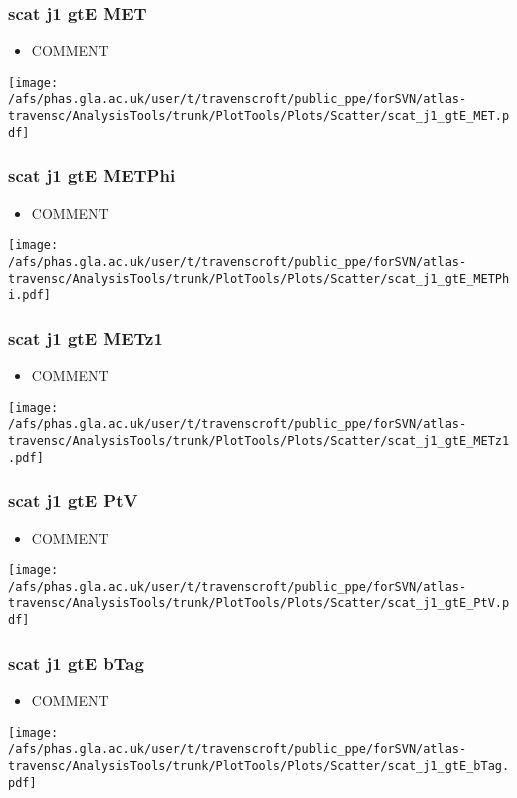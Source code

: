 \documentclass{beamer}
\begin{document}
\begin{frame}
\frametitle{scat j1 gtE MET}
\begin{itemize}
\item COMMENT
\end{itemize}
\begin{center}
\texttt{[image: /afs/phas.gla.ac.uk/user/t/travenscroft/public\_ppe/forSVN/atlas-travensc/AnalysisTools/trunk/PlotTools/Plots/Scatter/scat\_j1\_gtE\_MET.pdf]}
\end{center}
\end{frame}

\begin{frame}
\frametitle{scat j1 gtE METPhi}
\begin{itemize}
\item COMMENT
\end{itemize}
\begin{center}
\texttt{[image: /afs/phas.gla.ac.uk/user/t/travenscroft/public\_ppe/forSVN/atlas-travensc/AnalysisTools/trunk/PlotTools/Plots/Scatter/scat\_j1\_gtE\_METPhi.pdf]}
\end{center}
\end{frame}

\begin{frame}
\frametitle{scat j1 gtE METz1}
\begin{itemize}
\item COMMENT
\end{itemize}
\begin{center}
\texttt{[image: /afs/phas.gla.ac.uk/user/t/travenscroft/public\_ppe/forSVN/atlas-travensc/AnalysisTools/trunk/PlotTools/Plots/Scatter/scat\_j1\_gtE\_METz1.pdf]}
\end{center}
\end{frame}

\begin{frame}
\frametitle{scat j1 gtE PtV}
\begin{itemize}
\item COMMENT
\end{itemize}
\begin{center}
\texttt{[image: /afs/phas.gla.ac.uk/user/t/travenscroft/public\_ppe/forSVN/atlas-travensc/AnalysisTools/trunk/PlotTools/Plots/Scatter/scat\_j1\_gtE\_PtV.pdf]}
\end{center}
\end{frame}

\begin{frame}
\frametitle{scat j1 gtE bTag}
\begin{itemize}
\item COMMENT
\end{itemize}
\begin{center}
\texttt{[image: /afs/phas.gla.ac.uk/user/t/travenscroft/public\_ppe/forSVN/atlas-travensc/AnalysisTools/trunk/PlotTools/Plots/Scatter/scat\_j1\_gtE\_bTag.pdf]}
\end{center}
\end{frame}
\end{document}
